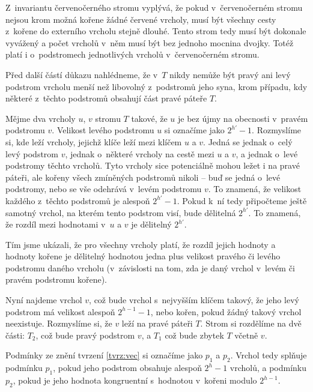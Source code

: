 \begin{dukaz}
Z~invariantu červenočerného stromu vyplývá, že pokud v~červenočerném stro\-mu nejsou krom možná kořene žádné červené vrcholy, musí být všechny cesty z~kořene do externího vrcholu stejně dlouhé. Tento strom tedy musí být dokonale vyvážený a počet vrcholů v~něm musí být bez jednoho mocnina dvojky. Totéž platí i o~podstromech jednotlivých vrcholů v~červenočerném stromu.

Před další částí důkazu nahlédneme, že v~$T$ nikdy nemůže být pravý ani levý podstrom vrcholu menší než libovolný z~podstromů jeho syna, krom případu, kdy některé z~těchto podstromů obsahují část pravé páteře $T$.

Mějme dva vrcholy $u$, $v$ stromu $T$ takové, že $u$ je bez újmy na obecnosti v~pravém
podstromu $v$. Velikost levého podstromu $u$ si označíme jako $2^{h'}-1$. Rozmyslíme si, kde leží vrcholy, jejichž klíče leží mezi klíčem
$u$ a $v$. Jedná se jednak o~celý levý podstrom $v$, jednak o~některé vrcholy
na cestě mezi $u$ a $v$, a jednak o~levé podstromy těchto vrcholů. Tyto vrcholy
sice potenciálně mohou ležet i na pravé páteři, ale kořeny všech zmíněných podstromů nikoli -- buď se jedná o~levé podstromy, nebo se vše odehrává v~levém podstromu $v$. To znamená, že velikost každého z~těchto podstromů je alespoň $2^{h'} - 1$. Pokud k~ní tedy připočteme ještě samotný vrchol, na kterém tento podstrom visí, bude dělitelná $2^{h'}$. To znamená, že rozdíl mezi hodnotami v~$u$ a $v$ je dělitelný $2^{h'}$.

\begin{pozorovani}\label{poz:1}
Tím jsme ukázali, že pro všechny vrcholy platí, že rozdíl jejich hodnoty a hodnoty kořene je dělitelný hodnotou jedna plus velikost pravého či levého podstromu daného vrcholu (v~závislosti na tom, zda je daný vrchol v~levém či pravém podstromu kořene).
\end{pozorovani}

Nyní najdeme vrchol $v$, což bude vrchol s~nejvyšším klíčem takový, že jeho levý
podstrom má velikost alespoň $2^{h-1} -1$, nebo kořen, pokud žádný takový vrchol neexistuje. Rozmyslíme si, že $v$ leží na pravé páteři $T$. Strom si
rozdělíme na dvě části: $T_2$, což bude pravý podstrom $v$, a $T_1$ což bude zbytek $T$ včetně $v$.

Podmínky ze znění tvrzení \ref{tvrz:vec} si označíme jako $p_1$ a $p_2$. Vrchol tedy splňuje podmínku $p_1$, pokud jeho podstrom obsahuje alespoň $2^h-1$ vrcholů, a podmínku $p_2$, pokud je jeho hodnota kongruentní s~hodnotou v~kořeni modulo $2^{h-1}$.


\end{dukaz}
